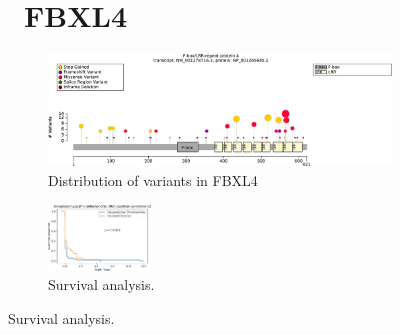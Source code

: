 \begin{figure}[htbp]
\section*{ FBXL4}
\centering
\begin{subfigure}[b]{0.95\textwidth}
\centering
\includegraphics[width=\textwidth]{ img/FBXL4_protein_diagram.pdf} 
\captionsetup{justification=raggedright,singlelinecheck=false}
\caption{Distribution of variants in FBXL4}
\end{subfigure}

\vspace{2em}

\begin{subfigure}[b]{0.95\textwidth}
\centering
\includegraphics[width=0.3\textwidth]{ img/FBXL4_stats.pdf} 
\captionsetup{justification=raggedright,singlelinecheck=false}
\caption{Survival analysis.}
\end{subfigure}

\vspace{1em}


\end{figure}
